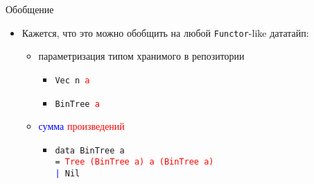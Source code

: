 \begin{frame}{Обобщение}
  \begin{itemize}
  \item Кажется, что это можно обобщить на любой \texttt{Functor}-like
    дататайп:
    \begin{itemize}
    \item параметризация типом хранимого в репозитории
      \begin{itemize}
      \item \texttt{Vec n \textcolor{red}{a}}
      \item \texttt{BinTree \textcolor{red}{a}}
      \end{itemize}
    \item \textcolor{blue}{сумма} \textcolor{red}{произведений}
      \begin{itemize}
      \item \texttt{data BinTree a\\= \textcolor{red}{Tree (BinTree a)
            a (BinTree a)} \\\textcolor{blue}{|} Nil}
      \end{itemize}
    \end{itemize}
  \end{itemize}
\end{frame}
